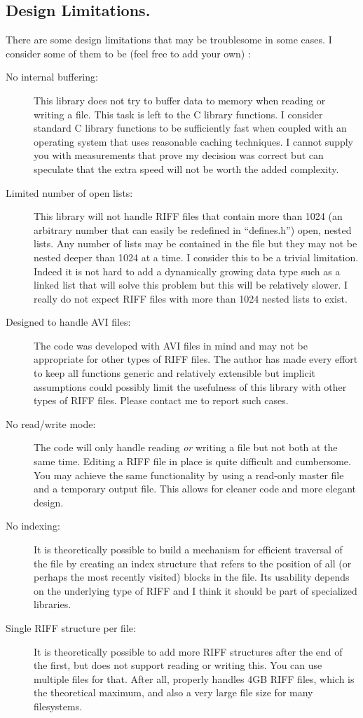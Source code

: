 \documentclass[12pt, a4paper]{article}
\begin{document}
\subsection{Design Limitations.} 
There are some design limitations that may be troublesome in some cases.
I consider some of them to be (feel free to add your own) :
\begin{description}
\item[No internal buffering:] This library does not try to buffer data to
memory when reading or writing a file. This task is left to the C library
functions. I consider standard C library functions to be
sufficiently fast when coupled with an operating system that uses reasonable 
caching techniques.  I cannot supply you with measurements that prove my 
decision was correct but can speculate that the extra speed will not be 
worth the added complexity.
\item[Limited number of open lists:] This library will not handle RIFF
files that contain more than 1024 (an arbitrary number that can easily be
redefined in ``defines.h'') open, nested
lists. Any number of lists may be contained in the file but they may not
be nested deeper than 1024 at a time. I consider this to be a trivial 
limitation. Indeed it is not hard to add a dynamically growing data 
type such as a linked list that will solve this problem but this 
will be relatively slower. I really do not expect RIFF files with more 
than 1024 nested lists to exist. 
\item[Designed to handle AVI files:] The code was developed with AVI files
in mind and may not be appropriate for other types of RIFF files. The author
has made every effort to keep all functions generic and relatively extensible
but implicit assumptions could possibly limit the usefulness of this library
with other types of RIFF files. Please contact me to report such cases.
\item[No read/write mode:] The code will only handle reading
\emph{or} writing a file but not both at the same time. Editing a RIFF file
in place is quite difficult and cumbersome. You may achieve the same functionality
by using a read-only master file and a temporary output file. This allows for cleaner
code and more elegant design. 
\item[No indexing:] It is theoretically possible to build a mechanism for 
efficient traversal of the file by creating an index structure that
refers to the position of all (or perhaps the most recently visited) blocks
in the file. Its usability depends on the underlying type of RIFF and I 
think it should be part of specialized libraries.
\item[Single RIFF structure per file:] It is theoretically possible to add more RIFF
structures after the end of the first, but \libriff{} does not support reading
or writing this. You can use multiple files for that. After all, \libriff{}
properly handles 4GB RIFF files, which is the theoretical maximum, and also
a very large file size for many filesystems. 
\end{description}
\end{document}
